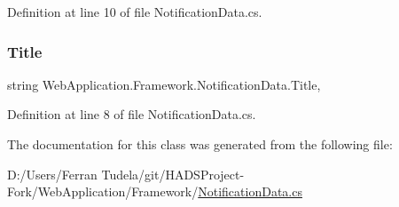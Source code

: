 Definition at line 10 of file Notification\+Data.\+cs.

\mbox{\label{classWebApplication_1_1Framework_1_1NotificationData_a4c00314a56a6d3bd97d52af56b783783}} 
\subsubsection{\texorpdfstring{Title}{Title}}
{\footnotesize\ttfamily string Web\+Application.\+Framework.\+Notification\+Data.\+Title\hspace{0.3cm}{\ttfamily [get]}, {\ttfamily [set]}}



Definition at line 8 of file Notification\+Data.\+cs.



The documentation for this class was generated from the following file\+:\begin{DoxyCompactItemize}
\item 
D\+:/\+Users/\+Ferran Tudela/git/\+H\+A\+D\+S\+Project-\/\+Fork/\+Web\+Application/\+Framework/\mbox{\hyperlink{NotificationData_8cs}{Notification\+Data.\+cs}}\end{DoxyCompactItemize}

